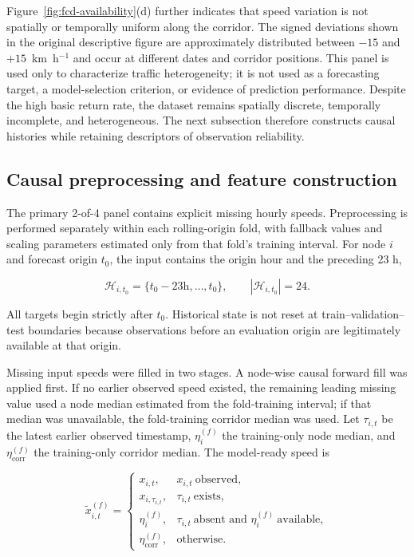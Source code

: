 \documentclass[pdflatex,sn-basic,Numbered]{sn-jnl}
\begin{document}
Figure~\ref{fig:fcd-availability}(d) further indicates that speed variation is not spatially or temporally uniform along the corridor. The signed deviations shown in the original descriptive figure are approximately distributed between $-15$ and $+15$~km~h$^{-1}$ and occur at different dates and corridor positions. This panel is used only to characterize traffic heterogeneity; it is not used as a forecasting target, a model-selection criterion, or evidence of prediction performance. Despite the high basic return rate, the dataset remains spatially discrete, temporally incomplete, and heterogeneous. The next subsection therefore constructs causal histories while retaining descriptors of observation reliability.

\subsection{Causal preprocessing and feature construction}
\label{subsec:features}

The primary 2-of-4 panel contains explicit missing hourly speeds. Preprocessing is performed separately within each rolling-origin fold, with fallback values and scaling parameters estimated only from that fold's training interval. For node $i$ and forecast origin $t_0$, the input contains the origin hour and the preceding 23 h,

\begin{equation}
\mathcal{H}_{i,t_0}=\{t_0-23\mathrm{h},\ldots,t_0\},
\qquad |\mathcal{H}_{i,t_0}|=24.
\label{eq:history_window}
\end{equation}

All targets begin strictly after $t_0$. Historical state is not reset at train--validation--test boundaries because observations before an evaluation origin are legitimately available at that origin.

Missing input speeds were filled in two stages. A node-wise causal forward fill was applied first. If no earlier observed speed existed, the remaining leading missing value used a node median estimated from the fold-training interval; if that median was unavailable, the fold-training corridor median was used. Let $\tau_{i,t}$ be the latest earlier observed timestamp, $\eta_i^{(f)}$ the training-only node median, and $\eta_{\mathrm{corr}}^{(f)}$ the training-only corridor median. The model-ready speed is

\begin{equation}
\widetilde{x}_{i,t}^{(f)}=
\begin{cases}
x_{i,t}, & x_{i,t}\ \text{observed},\\
x_{i,\tau_{i,t}}, & \tau_{i,t}\ \text{exists},\\
\eta_i^{(f)}, & \tau_{i,t}\ \text{absent and }\eta_i^{(f)}\ \text{available},\\
\eta_{\mathrm{corr}}^{(f)}, & \text{otherwise}.
\end{cases}
\label{eq:causal_fill}
\end{equation}
\end{document}
